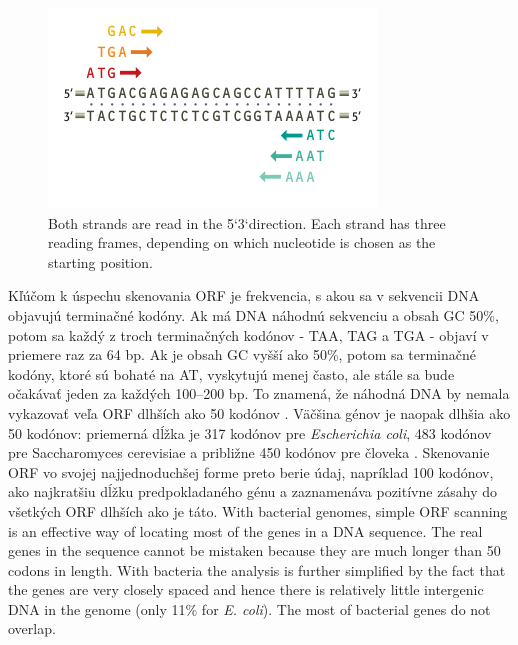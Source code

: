 \begin{figure}[!ht]
	\centering
	\includegraphics[width=.6\textwidth]{figures/ORF2.png}
	\caption{Both
	strands are read in the 5`3`direction. Each
	strand has three reading frames, depending
	on which nucleotide is chosen as the
	starting position.\label{o:latex_friendly_zone}}
\end{figure}

Kľúčom k úspechu skenovania ORF je frekvencia, s akou sa v sekvencii DNA objavujú terminačné kodóny.
Ak má DNA náhodnú sekvenciu a obsah GC 50\%, potom sa každý z troch terminačných kodónov - TAA, TAG a TGA - objaví v priemere raz za 64 bp.
Ak je obsah GC vyšší ako 50\%, potom sa terminačné kodóny, ktoré sú bohaté na AT, vyskytujú menej často, ale stále sa bude očakávať jeden za každých 100–200 bp.
To znamená, že náhodná DNA by nemala vykazovať veľa ORF dlhších ako 50 kodónov \cite{orf}.
Väčšina génov je naopak dlhšia ako 50 kodónov: priemerná dĺžka je 317 kodónov pre \textit{Escherichia coli}, 483 kodónov pre Saccharomyces cerevisiae a približne 450 kodónov pre človeka \cite{FindingGenes}.
Skenovanie ORF vo svojej najjednoduchšej forme preto berie údaj, napríklad 100 kodónov, ako najkratšiu dĺžku predpokladaného génu a zaznamenáva pozitívne zásahy do všetkých ORF dlhších ako je táto.
With bacterial genomes, simple ORF scanning is an effective way of locating most of the genes in a DNA sequence.
The real genes in the sequence cannot be mistaken because they are much longer than 50 codons in length. 
With bacteria the analysis is further simplified by the fact that the genes are very closely spaced and hence there is relatively little intergenic DNA in the genome (only 11\% for \textit{E. coli}). 
The most of bacterial genes do not overlap.

